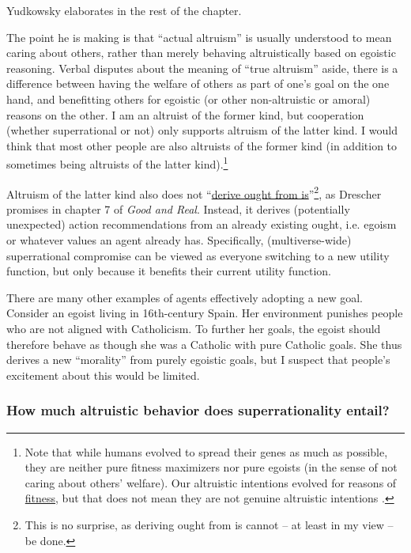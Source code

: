 Yudkowsky elaborates in the rest of the chapter.

The point he is making is that ``actual altruism'' is usually understood
to mean caring about others, rather than merely behaving altruistically
based on egoistic reasoning. Verbal disputes about the meaning of ``true
altruism'' aside, there is a difference between having the welfare of
others as part of one's goal on the one hand, and benefitting others for
egoistic (or other non-altruistic or amoral) reasons on the other. I am
an altruist of the former kind, but cooperation (whether superrational
or not) only supports altruism of the latter kind. I would think that
most other people are also altruists of the former kind (in addition to
sometimes being altruists of the latter kind).\footnote{Note that while
  humans evolved to spread their genes as much as possible, they are
  neither pure fitness maximizers nor pure egoists (in the sense of not
  caring about others' welfare). Our altruistic intentions evolved for
  reasons of
  \href{https://en.wikipedia.org/wiki/Fitness_\%28biology\%29}{fitness},
  but that does not mean they are not genuine altruistic intentions
  \parencite{Yudkowsky2015-tz,Cosmides1995-bz,Wright1995-po}.}

Altruism of the latter kind also does not
``\href{https://en.wikipedia.org/wiki/Is\%E2\%80\%93ought_problem}{derive
ought from is}''\footnote{This is no surprise, as
  deriving ought from is cannot -- at least in my view -- be done.}, as
Drescher promises in chapter 7 of \emph{Good and Real}. Instead, it
derives (potentially unexpected) action recommendations from an already
existing ought, i.e. egoism or whatever values an agent already has.
Specifically, (multiverse-wide) superrational compromise can be viewed
as everyone switching to a new utility function, but only because it
benefits their current utility function.

There are many other examples of agents effectively adopting a new goal.
Consider an egoist living in 16th-century Spain. Her environment
punishes people who are not aligned with Catholicism. To further her
goals, the egoist should therefore behave as though she was a Catholic
with pure Catholic goals. She thus derives a new ``morality'' from
purely egoistic goals, but I suspect that people's excitement about this
would be limited.

\subsubsection{How much altruistic behavior does superrationality
entail?}\label{how-much-altruistic-behavior-does-superrationality-entail}

